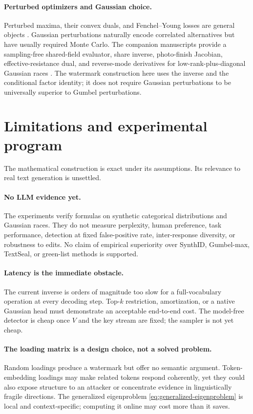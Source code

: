 \documentclass[11pt]{article}
\theoremstyle{definition}
\theoremstyle{remark}
\begin{document}
\paragraph{Perturbed optimizers and Gaussian choice.}
Perturbed maxima, their convex duals, and Fenchel--Young losses are general objects \citep{berthet2020perturbed,blondel2020fenchel,fosgerau2020choice}. Gaussian perturbations naturally encode correlated alternatives but have usually required Monte Carlo. The companion manuscripts provide a sampling-free shared-field evaluator, share inverse, photo-finish Jacobian, effective-resistance dual, and reverse-mode derivatives for low-rank-plus-diagonal Gaussian races \citep{cotton2026calibration,cotton2026gaussian}. The watermark construction here uses the inverse and the conditional factor identity; it does not require Gaussian perturbations to be universally superior to Gumbel perturbations.

\section{Limitations and experimental program}
\label{sec:limitations}

The mathematical construction is exact under its assumptions. Its relevance to real text generation is unsettled.

\paragraph{No LLM evidence yet.}
The experiments verify formulas on synthetic categorical distributions and Gaussian races. They do not measure perplexity, human preference, task performance, detection at fixed false-positive rate, inter-response diversity, or robustness to edits. No claim of empirical superiority over SynthID, Gumbel-max, TextSeal, or green-list methods is supported.

\paragraph{Latency is the immediate obstacle.}
The current inverse is orders of magnitude too slow for a full-vocabulary operation at every decoding step. Top-$k$ restriction, amortization, or a native Gaussian head must demonstrate an acceptable end-to-end cost. The model-free detector is cheap once $V$ and the key stream are fixed; the sampler is not yet cheap.

\paragraph{The loading matrix is a design choice, not a solved problem.}
Random loadings produce a watermark but offer no semantic argument. Token-embedding loadings may make related tokens respond coherently, yet they could also expose structure to an attacker or concentrate evidence in linguistically fragile directions. The generalized eigenproblem \eqref{eq:generalized-eigenproblem} is local and context-specific; computing it online may cost more than it saves.
\end{document}
